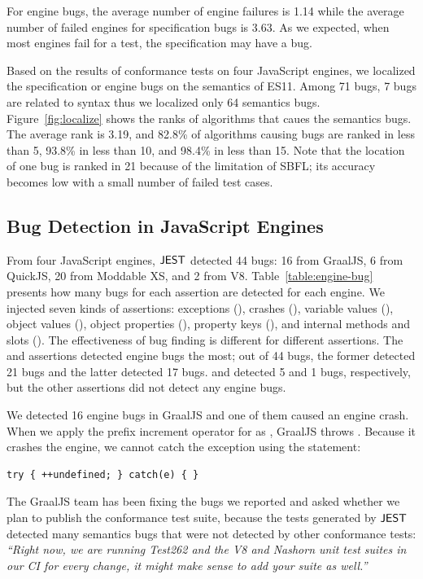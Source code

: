 \noindent
For engine bugs, the average number of engine failures is 1.14
while the average number of failed engines for specification bugs is 3.63.
As we expected, when most engines fail for a test, the specification
may have a bug.

Based on the results of conformance tests on four JavaScript engines, we localized
the specification or engine bugs on the semantics of ES11.
Among 71 bugs, 7 bugs are related to syntax thus we localized only 64 semantics bugs.
Figure~\ref{fig:localize} shows the ranks of algorithms that caues the semantics bugs.
The average rank is 3.19, and 82.8\% of algorithms causing
bugs are ranked in less than 5, 93.8\% in less than 10, and 98.4\% in less than 15.
Note that the location of one bug is ranked in 21 because of the limitation of SBFL;
its accuracy becomes low with a small number of failed test cases.



\subsection{Bug Detection in JavaScript Engines}
From four JavaScript engines, $\tool$ detected 44 bugs:
16 from GraalJS, 6 from QuickJS,
20 from Moddable XS, and 2 from V8.
Table~\ref{table:engine-bug} presents how many bugs for each assertion are detected
for each engine.  We injected seven kinds of assertions: exceptions
(), crashes (), variable values (), object
values (), object properties (), property keys
(), and internal methods and slots ().
The effectiveness of bug finding is different for different assertions.
The  and  assertions detected
engine bugs the most; out of 44 bugs, the former detected 21 bugs
and the latter detected 17 bugs.
 and  detected 5 and 1 bugs, respectively, but the
other assertions did not detect any engine bugs.

We detected 16 engine bugs in GraalJS and one of them caused an engine
crash.  When we apply the prefix increment operator for 
as , GraalJS throws .
Because it crashes the engine, we cannot catch the exception using the
 statement:
\begin{lstlisting}[style=myJSstyle]
    try { ++undefined; } catch(e) { }
\end{lstlisting}
The GraalJS team has been fixing the bugs we reported and
asked whether we plan to publish the conformance test suite,
because the tests generated by $\tool$ detected many semantics bugs that
were not detected by other conformance tests:
\emph{``Right now, we are running Test262 and the V8 and Nashorn
unit test suites in our CI for every change, it might make sense to
add your suite as well.''}

